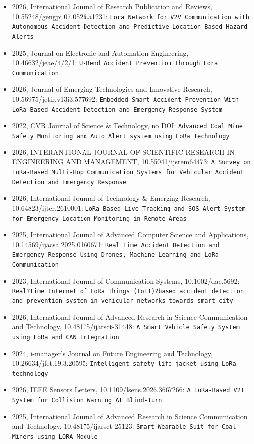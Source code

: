 \begin{itemize}
\item 2026, International Journal of Research Publication and Reviews, 10.55248/gengpi.07.0526.a1231: \texttt{Lora Network for V2V Communication with Autonomous Accident Detection and Predictive Location-Based Hazard Alerts}
\item 2025, Journal on Electronic and Automation Engineering, 10.46632/jeae/4/2/1: \texttt{U-Bend Accident Prevention Through Lora Communication}
\item 2026, Journal of Emerging Technologies and Innovative Research, 10.56975/jetir.v13i3.577692: \texttt{Embedded Smart Accident Prevention With LoRa Based Accident Detection and Emergency Response System}
\item 2022, CVR Journal of Science \& Technology, no DOI: \texttt{Advanced Coal Mine Safety Monitoring and Auto Alert system using LoRa Technology}
\item 2026, INTERANTIONAL JOURNAL OF SCIENTIFIC RESEARCH IN ENGINEERING AND MANAGEMENT, 10.55041/ijsrem64473: \texttt{A Survey on LoRa-Based Multi-Hop Communication Systems for Vehicular Accident Detection and Emergency Response}
\item 2026, International Journal of Technology \& Emerging Research, 10.64823/ijter.2610001: \texttt{LoRa-Based Live Tracking and SOS Alert System for Emergency Location Monitoring in Remote Areas}
\item 2025, International Journal of Advanced Computer Science and Applications, 10.14569/ijacsa.2025.0160671: \texttt{Real Time Accident Detection and Emergency Response Using Drones, Machine Learning and LoRa Communication}
\item 2023, International Journal of Communication Systems, 10.1002/dac.5692: \texttt{Real?time Internet of LoRa Things (IoLT)?based accident detection and prevention system in vehicular networks towards smart city}
\item 2026, International Journal of Advanced Research in Science Communication and Technology, 10.48175/ijarsct-31448: \texttt{A Smart Vehicle Safety System using LoRa and CAN Integration}
\item 2024, i-manager's Journal on Future Engineering and Technology, 10.26634/jfet.19.3.20595: \texttt{Intelligent safety life jacket using LoRa technology}
\item 2026, IEEE Sensors Letters, 10.1109/lsens.2026.3667266: \texttt{A LoRa-Based V2I System for Collision Warning At Blind-Turn}
\item 2025, International Journal of Advanced Research in Science Communication and Technology, 10.48175/ijarsct-25123: \texttt{Smart Wearable Suit for Coal Miners using LORA Module}

\end{itemize}
